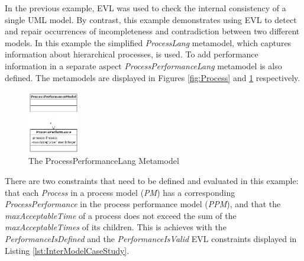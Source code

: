 In the previous example, EVL was used to check the internal consistency of a single UML model. By contrast, this example demonstrates using EVL to detect and repair occurrences of incompleteness and contradiction between two different models. In this example the simplified \emph{ProcessLang} metamodel, which captures information about hierarchical processes, is used. To add performance information in a separate aspect \emph{ProcessPerformanceLang} metamodel is also defined. The metamodels are displayed in Figures \ref{fig:Process} and \ref{fig:ProcessPerformance} respectively.

\begin{figure}[b]
	\centering
		\includegraphics[width=0.2\textwidth]{images/ProcessPerformance.png}
	\caption{The ProcessPerformanceLang Metamodel}
	\label{fig:ProcessPerformance}
\end{figure}

There are two constraints that need to be defined and evaluated in this example: that each \emph{Process} in a process model (\emph{PM}) has a corresponding \emph{ProcessPerformance} in the process performance model (\emph{PPM}), and that the \emph{maxAcceptableTime} of a process does not exceed the sum of the \emph{maxAcceptableTimes} of its children. This is achieves with the \emph{PerformanceIsDefined} and the \emph{PerformanceIsValid} EVL constraints displayed in Listing \ref{lst:InterModelCaseStudy}.



